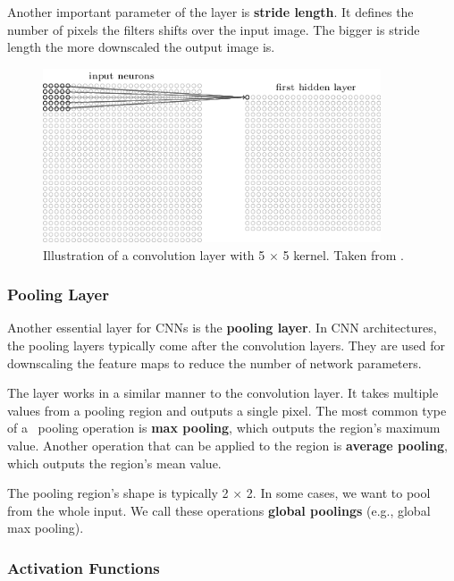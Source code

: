 Another important parameter of the layer is \textbf{stride length}. It defines the number of pixels the filters shifts over the input image. The bigger is stride length the more downscaled the output image is.


\begin{figure}[h]
    \centering
    \includegraphics[width=10cm]{Sources/Figures/convolution.png}
    \caption{Illustration of a convolution layer with 5 $\times$ 5 kernel. Taken from \cite{nielsenneural}.}
    \label{fig:convolution}
\end{figure}

\subsubsection{Pooling Layer}
Another essential layer for CNNs is the \textbf{pooling layer}. In CNN architectures, the pooling layers typically come after the convolution layers. They are used for downscaling the feature maps to reduce the number of network parameters. 

The layer works in a similar manner to the convolution layer. It takes multiple values from a pooling region and outputs a single pixel. The most common type of a~ pooling operation is \textbf{max pooling}, which outputs the region's maximum value. Another operation that can be applied to the region is \textbf{average pooling}, which outputs the region's mean value.

The pooling region's shape is typically 2 $\times$ 2. In some cases, we want to pool from the whole input. We call these operations \textbf{global poolings} (e.g., global max pooling).

\subsubsection{Activation Functions}
\label{afunctions}

